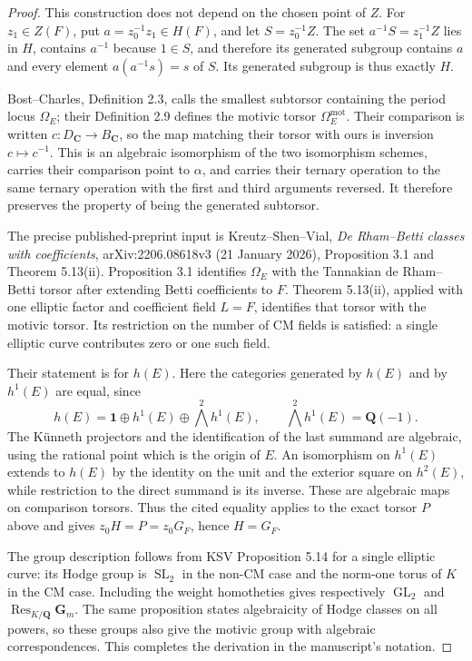 \begin{proof}
This construction does not depend on the chosen point of \(Z\). For
\(z_1\in Z(F)\), put \(a=z_0^{-1}z_1\in H(F)\), and let
\(S=z_0^{-1}Z\). The set \(a^{-1}S=z_1^{-1}Z\) lies in \(H\), contains
\(a^{-1}\) because \(1\in S\), and therefore its generated subgroup
contains \(a\) and every element \(a(a^{-1}s)=s\) of \(S\). Its generated
subgroup is thus exactly \(H\).

Bost--Charles, Definition 2.3, calls the smallest subtorsor containing the
period locus \(\Omega_E\); their Definition 2.9 defines the motivic torsor
\(\Omega_E^{\mathrm{mot}}\). Their comparison is written
\(c:D_{\mathbf C}\to B_{\mathbf C}\), so the map matching their torsor
with ours is inversion \(c\mapsto c^{-1}\). This is an algebraic
isomorphism of the two isomorphism schemes, carries their comparison point
to \(\alpha\), and carries their ternary operation to the same ternary
operation with the first and third arguments reversed. It therefore
preserves the property of being the generated subtorsor.

The precise published-preprint input is Kreutz--Shen--Vial,
\emph{De Rham--Betti classes with coefficients}, arXiv:2206.08618v3 (21 January
2026), Proposition 3.1 and Theorem 5.13(ii). Proposition 3.1 identifies
\(\Omega_E\) with the Tannakian de Rham--Betti torsor after extending Betti
coefficients to \(F\). Theorem 5.13(ii), applied with one elliptic factor
and coefficient field \(L=F\), identifies that torsor with the motivic
torsor. Its restriction on the number of CM fields is satisfied: a single
elliptic curve contributes zero or one such field.

Their statement is for \(h(E)\). Here the categories generated by \(h(E)\)
and by \(h^1(E)\) are equal, since
\[
h(E)=\mathbf1\oplus h^1(E)\oplus\bigwedge^2h^1(E),
\qquad \bigwedge^2h^1(E)=\mathbf Q(-1).
\]
The Künneth projectors and the identification of the last summand are
algebraic, using the rational point which is the origin of \(E\). An
isomorphism on \(h^1(E)\) extends to \(h(E)\) by the identity on the unit
and the exterior square on \(h^2(E)\), while restriction to the direct
summand is its inverse. These are algebraic maps on comparison torsors.
Thus the cited equality applies to the exact torsor \(P\) above and gives
\(z_0H=P=z_0G_F\), hence \(H=G_F\).

The group description follows from KSV Proposition 5.14 for a single
elliptic curve: its Hodge group is \(\operatorname{SL}_2\) in the non-CM
case and the norm-one torus of \(K\) in the CM case. Including the weight
homotheties gives respectively \(\operatorname{GL}_2\) and
\(\operatorname{Res}_{K/\mathbf Q}\mathbf G_m\). The same proposition
states algebraicity of Hodge classes on all powers, so these groups also
give the motivic group with algebraic correspondences. This completes the
derivation in the manuscript's notation.


\end{proof}
